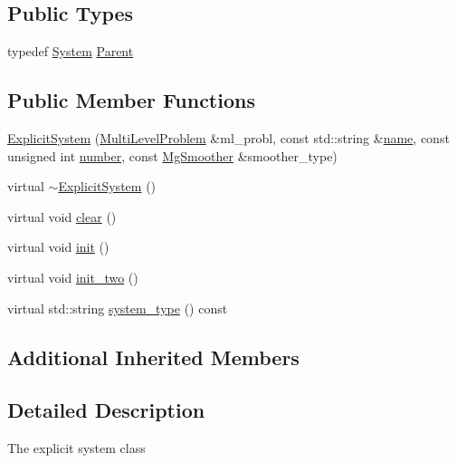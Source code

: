 \subsection*{Public Types}
\begin{DoxyCompactItemize}
\item 
typedef \mbox{\hyperlink{classfemus_1_1_system}{System}} \mbox{\hyperlink{classfemus_1_1_explicit_system_ad338cb1d97f154cadb9e630ada84f447}{Parent}}
\end{DoxyCompactItemize}
\subsection*{Public Member Functions}
\begin{DoxyCompactItemize}
\item 
\mbox{\hyperlink{classfemus_1_1_explicit_system_a8d4304329b95b7c570c846fd919156a0}{Explicit\+System}} (\mbox{\hyperlink{classfemus_1_1_multi_level_problem}{Multi\+Level\+Problem}} \&ml\+\_\+probl, const std\+::string \&\mbox{\hyperlink{classfemus_1_1_system_a1a007c176529dae649887bbd1cb46103}{name}}, const unsigned int \mbox{\hyperlink{classfemus_1_1_system_a28f5c7f6286dd597ae28a8923c8dca11}{number}}, const \mbox{\hyperlink{_mg_smoother_enum_8hpp_a4d11c2ff93e2f0f440c879a9c40cda71}{Mg\+Smoother}} \&smoother\+\_\+type)
\item 
virtual \mbox{\hyperlink{classfemus_1_1_explicit_system_aa043bf47db592a14016c84f5adaaa4a5}{$\sim$\+Explicit\+System}} ()
\item 
virtual void \mbox{\hyperlink{classfemus_1_1_explicit_system_ac078fbc3f758429e8a60dac487aab5ce}{clear}} ()
\item 
virtual void \mbox{\hyperlink{classfemus_1_1_explicit_system_a6736fef684fe763b26e016ff3f8b37b7}{init}} ()
\item 
virtual void \mbox{\hyperlink{classfemus_1_1_explicit_system_a149e74ccad300a58b25f72a6b0439f2b}{init\+\_\+two}} ()
\item 
virtual std\+::string \mbox{\hyperlink{classfemus_1_1_explicit_system_a91f61bd0aa02102fe9af817da96be72b}{system\+\_\+type}} () const
\end{DoxyCompactItemize}
\subsection*{Additional Inherited Members}


\subsection{Detailed Description}
The explicit system class 


